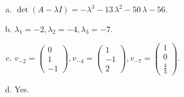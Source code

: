\begin{questions}
\begin{solution}
\begin{enumerate}[(a)]
\item $\det(A-\lambda I)=-{\lambda}^{3} - 13 \, {\lambda}^{2} - 50 \, {\lambda} - 56$.
\item ${\lambda}_1=-2, {\lambda}_2=-4, {\lambda}_3=-7$.
\item $v_{-2}=\left(\begin{array}{r}
0 \\
1 \\
-1
\end{array}\right), v_{-4}=\left(\begin{array}{r}
1 \\
-1 \\
2
\end{array}\right), v_{-7}=\left(\begin{array}{r}
1 \\
0 \\
\frac{4}{3}
\end{array}\right)$.
\item Yes.
\end{enumerate}
\end{solution}

\end{questions}

\newpage


\begin{center}
\end{center}

